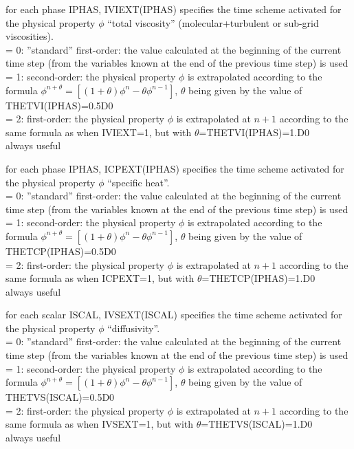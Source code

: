{for each phase IPHAS, IVIEXT(IPHAS) specifies the time scheme activated
for the physical property $\phi$ ``total viscosity''
(molecular+turbulent or sub-grid viscosities).\\
\hspace*{1.3cm}= 0: ''standard'' first-order: the value calculated at
the beginning of the current time step (from the
variables known at the end of the previous time step) is used \\
\hspace*{1.3cm}= 1: second-order: the physical property $\phi$ is
extrapolated according to the formula
$\phi^{n+\theta}=[(1+\theta)\phi^n-\theta \phi^{n-1}]$, $\theta$ being
given by the value of THETVI(IPHAS)=0.5D0 \\
\hspace*{1.3cm}= 2: first-order: the physical property $\phi$ is
extrapolated at $n+1$ according to the
same formula as when IVIEXT=1, but with $\theta$=THETVI(IPHAS)=1.D0\\
always useful}

{for each phase IPHAS, ICPEXT(IPHAS) specifies the time scheme activated
for the physical property $\phi$ ``specific heat''.\\
\hspace*{1.3cm}= 0: ''standard'' first-order: the value calculated at
the beginning of the current time step (from the
variables known at the end of the previous time step) is used \\
\hspace*{1.3cm}= 1: second-order: the physical property $\phi$ is
extrapolated according to the formula
$\phi^{n+\theta}=[(1+\theta)\phi^n-\theta \phi^{n-1}]$, $\theta$ being
given by the value of THETCP(IPHAS)=0.5D0 \\
\hspace*{1.3cm}= 2: first-order: the physical property $\phi$ is
extrapolated at $n+1$ according to the
same formula as when ICPEXT=1, but with $\theta$=THETCP(IPHAS)=1.D0\\
always useful}

{for each scalar ISCAL, IVSEXT(ISCAL) specifies the time scheme activated
for the physical property $\phi$ ``diffusivity''.\\
\hspace*{1.3cm}= 0: ''standard'' first-order: the value calculated at
the beginning of the current time step (from the
variables known at the end of the previous time step) is used \\
\hspace*{1.3cm}= 1: second-order: the physical property $\phi$ is
extrapolated according to the formula
$\phi^{n+\theta}=[(1+\theta)\phi^n-\theta \phi^{n-1}]$, $\theta$ being
given by the value of THETVS(ISCAL)=0.5D0 \\
\hspace*{1.3cm}= 2: first-order: the physical property $\phi$ is
extrapolated at $n+1$ according to the
same formula as when IVSEXT=1, but with $\theta$=THETVS(ISCAL)=1.D0\\
always useful}

